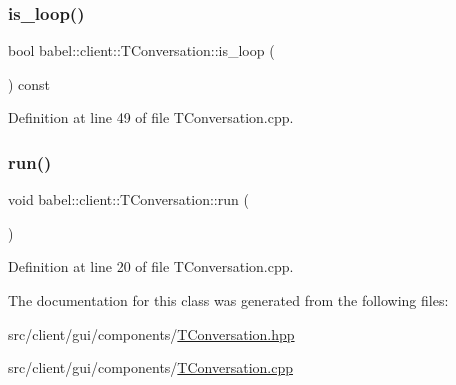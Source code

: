\subsubsection{\texorpdfstring{is\+\_\+loop()}{is\_loop()}}
{\footnotesize\ttfamily bool babel\+::client\+::\+T\+Conversation\+::is\+\_\+loop (\begin{DoxyParamCaption}{ }\end{DoxyParamCaption}) const}



Definition at line 49 of file T\+Conversation.\+cpp.

\mbox{\label{classbabel_1_1client_1_1_t_conversation_ab0a3324f0b8035495c48cf45d97d0ccd}} 
\subsubsection{\texorpdfstring{run()}{run()}}
{\footnotesize\ttfamily void babel\+::client\+::\+T\+Conversation\+::run (\begin{DoxyParamCaption}{ }\end{DoxyParamCaption})}



Definition at line 20 of file T\+Conversation.\+cpp.



The documentation for this class was generated from the following files\+:\begin{DoxyCompactItemize}
\item 
src/client/gui/components/\mbox{\hyperlink{_t_conversation_8hpp}{T\+Conversation.\+hpp}}\item 
src/client/gui/components/\mbox{\hyperlink{_t_conversation_8cpp}{T\+Conversation.\+cpp}}\end{DoxyCompactItemize}
